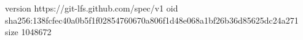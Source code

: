 version https://git-lfs.github.com/spec/v1
oid sha256:138fcfec40a0b5f1f02854760670a806f1d48e068a1bf26b36d85625dc24a271
size 1048672
